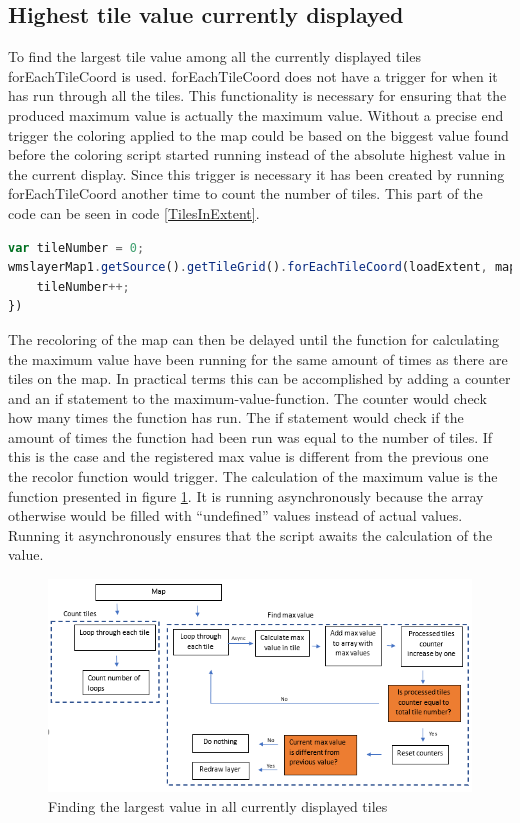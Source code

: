 \subsection{Highest tile value currently displayed}


To find the largest tile value among all the currently displayed tiles forEachTileCoord is used. forEachTileCoord does not have a trigger for when it has run through all the tiles. This functionality is necessary for ensuring that the produced maximum value is actually the maximum value. Without a precise end trigger the coloring applied to the map could be based on the biggest value found before the coloring script started running instead of the absolute highest value in the current display.
Since this trigger is necessary it has been created by running forEachTileCoord another time to count the number of tiles. This part of the code can be seen in code \ref{TilesInExtent}.
\begin{lstlisting}[language=JavaScript, caption={Counting the amount of tiles within the current extent}, label= TilesInExtent,escapechar=|] 
var tileNumber = 0;
wmslayerMap1.getSource().getTileGrid().forEachTileCoord(loadExtent, mapZoom - zoomlevelAdjustment, function(tileCoord) {
	tileNumber++;
})
\end{lstlisting}
The recoloring of the map can then be delayed until the function for calculating the maximum value have been running for the same amount of times as there are tiles on the map. In practical terms this can be accomplished by adding a counter and an if statement to the maximum-value-function. The counter would check how many times the function has run. The if statement would check if the amount of times the function had been run was equal to the number of tiles. If this is the case and the registered max value is different from the previous one the recolor function would trigger.
The calculation of the maximum value is the function presented in figure \ref{DoubleLoop}. It is running asynchronously because the array otherwise would be filled with “undefined” values instead of actual values. Running it asynchronously ensures that the script awaits the calculation of the value.  
\begin{figure} [H]
	\centering
	\includegraphics[width=1\textwidth]{Pictures/DoubleLoop}
	\caption{Finding the largest value in all currently displayed tiles}
	\label{DoubleLoop}
\end{figure}

